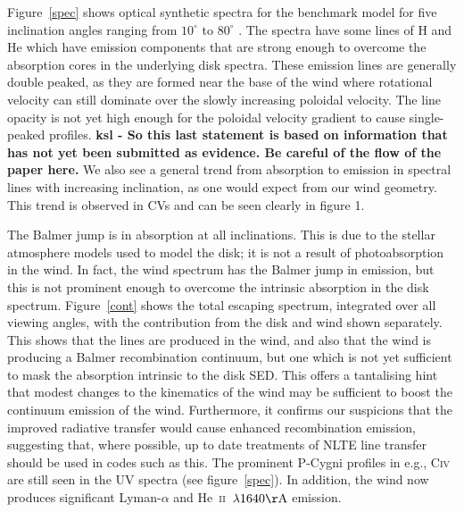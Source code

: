 \documentclass[preprint, a4paper, 11pt]{aastex}
\begin{document}
{Figure~\ref{spec} shows optical synthetic spectra for the benchmark 
model for five inclination angles ranging from $10^\circ$ to $80^\circ$ .
The spectra have some lines of H and He which have emission components that are strong enough to overcome
the absorption cores in the underlying disk spectra. These emission lines are generally double peaked, 
as they are formed near the base of the wind where rotational velocity
can still dominate over the slowly increasing poloidal velocity. The line 
opacity is not yet high enough for the poloidal velocity gradient to 
cause single-peaked profiles.  {\bf ksl - So this last statement is based on information that has not yet been submitted as evidence. Be careful of the flow of the paper here.}
We also see a general trend from absorption to emission in spectral lines
with increasing inclination, as one would expect from our wind geometry.
This trend is observed in CVs and can be seen clearly in figure 1. 

The Balmer jump is in absorption at all inclinations. This is 
due to the stellar atmosphere models used to model the disk;
it is not a result of photoabsorption in the wind.
In fact, the wind spectrum has the Balmer jump in emission, 
but this is not prominent enough
to overcome the intrinsic absorption in the disk spectrum. 
Figure~\ref{cont} shows the total escaping spectrum, integrated
over all viewing angles, with the contribution from the disk and wind
shown separately. This shows that the lines are produced in the wind,
and also that the wind is producing a Balmer recombination
continuum, but one which is not yet sufficient to mask the absorption 
intrinsic to the disk SED. This offers a tantalising hint
that modest changes to the kinematics of the wind
may be sufficient to boost the continuum emission of the wind.
Furthermore, it confirms our suspicions that the improved
radiative transfer would cause enhanced recombination emission,
suggesting that, where possible, up to date treatments of
NLTE line transfer should be used in codes such as this.
The prominent P-Cygni profiles in e.g., C\textsc{iv} are still seen
in the UV spectra (see figure~\ref{spec}). In addition, the wind 
now produces significant Lyman-$\alpha$ and
He~\textsc{ii}~$\lambda1640{\rm \AA}$  emission. 

}
\end{document}
